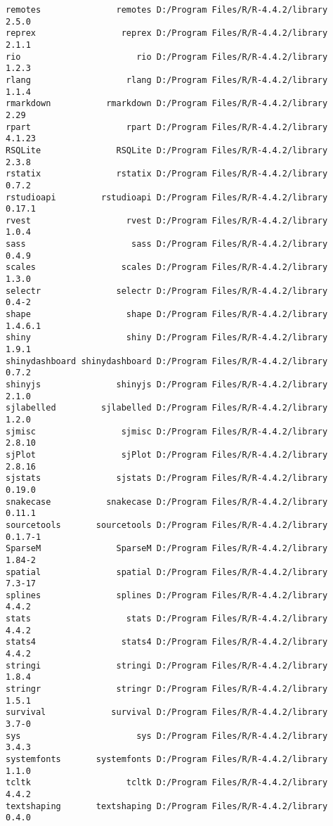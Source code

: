 \documentclass[
  letterpaper,
  DIV=11,
  numbers=noendperiod]{scrreprt}
\begin{document}
\begin{verbatim}
remotes               remotes D:/Program Files/R/R-4.4.2/library      2.5.0
reprex                 reprex D:/Program Files/R/R-4.4.2/library      2.1.1
rio                       rio D:/Program Files/R/R-4.4.2/library      1.2.3
rlang                   rlang D:/Program Files/R/R-4.4.2/library      1.1.4
rmarkdown           rmarkdown D:/Program Files/R/R-4.4.2/library       2.29
rpart                   rpart D:/Program Files/R/R-4.4.2/library     4.1.23
RSQLite               RSQLite D:/Program Files/R/R-4.4.2/library      2.3.8
rstatix               rstatix D:/Program Files/R/R-4.4.2/library      0.7.2
rstudioapi         rstudioapi D:/Program Files/R/R-4.4.2/library     0.17.1
rvest                   rvest D:/Program Files/R/R-4.4.2/library      1.0.4
sass                     sass D:/Program Files/R/R-4.4.2/library      0.4.9
scales                 scales D:/Program Files/R/R-4.4.2/library      1.3.0
selectr               selectr D:/Program Files/R/R-4.4.2/library      0.4-2
shape                   shape D:/Program Files/R/R-4.4.2/library    1.4.6.1
shiny                   shiny D:/Program Files/R/R-4.4.2/library      1.9.1
shinydashboard shinydashboard D:/Program Files/R/R-4.4.2/library      0.7.2
shinyjs               shinyjs D:/Program Files/R/R-4.4.2/library      2.1.0
sjlabelled         sjlabelled D:/Program Files/R/R-4.4.2/library      1.2.0
sjmisc                 sjmisc D:/Program Files/R/R-4.4.2/library     2.8.10
sjPlot                 sjPlot D:/Program Files/R/R-4.4.2/library     2.8.16
sjstats               sjstats D:/Program Files/R/R-4.4.2/library     0.19.0
snakecase           snakecase D:/Program Files/R/R-4.4.2/library     0.11.1
sourcetools       sourcetools D:/Program Files/R/R-4.4.2/library    0.1.7-1
SparseM               SparseM D:/Program Files/R/R-4.4.2/library     1.84-2
spatial               spatial D:/Program Files/R/R-4.4.2/library     7.3-17
splines               splines D:/Program Files/R/R-4.4.2/library      4.4.2
stats                   stats D:/Program Files/R/R-4.4.2/library      4.4.2
stats4                 stats4 D:/Program Files/R/R-4.4.2/library      4.4.2
stringi               stringi D:/Program Files/R/R-4.4.2/library      1.8.4
stringr               stringr D:/Program Files/R/R-4.4.2/library      1.5.1
survival             survival D:/Program Files/R/R-4.4.2/library      3.7-0
sys                       sys D:/Program Files/R/R-4.4.2/library      3.4.3
systemfonts       systemfonts D:/Program Files/R/R-4.4.2/library      1.1.0
tcltk                   tcltk D:/Program Files/R/R-4.4.2/library      4.4.2
textshaping       textshaping D:/Program Files/R/R-4.4.2/library      0.4.0

\end{verbatim}
\end{document}
